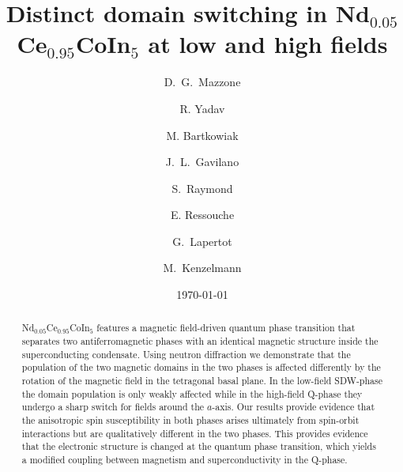 \documentclass[article,twocolumn,showpacs,preprintnumbers,amsmath,amssymb, superscriptaddress]{revtex4-1}
\begin{document}
\title{Distinct domain switching in Nd$_{0.05}$Ce$_{0.95}$CoIn$_5$ at low and high fields}

\ \author{D.~G.~Mazzone}
\ 

\ \author{R. Yadav}
\ 

\ \author{M. Bartkowiak}
\ 

\ \author{J.~L.~Gavilano}
\ 

\ \author{S.~Raymond}
\ 

 \author{E. Ressouche}
\ 

\ \author{G.~Lapertot}
\ 

\ \author{M.~Kenzelmann}
\ 
\ 

\date{\today}%
\begin{abstract}
Nd$_{0.05}$Ce$_{0.95}$CoIn$_5$ features a magnetic field-driven quantum phase transition that separates two antiferromagnetic phases with an identical magnetic structure inside the superconducting condensate. Using neutron diffraction we demonstrate that the population of the two magnetic domains in the two phases is affected differently by the rotation of the magnetic field in the tetragonal basal plane. In the low-field SDW-phase the domain population is only weakly affected while in the high-field Q-phase they undergo a sharp switch for fields around the $a$-axis. Our results provide evidence that the anisotropic spin susceptibility in both phases arises ultimately from spin-orbit interactions but are qualitatively different in the two phases. This provides evidence that the electronic structure is changed at the quantum phase transition, which yields a modified coupling between magnetism and superconductivity in the Q-phase. 
\end{abstract}
\maketitle
\end{document}
